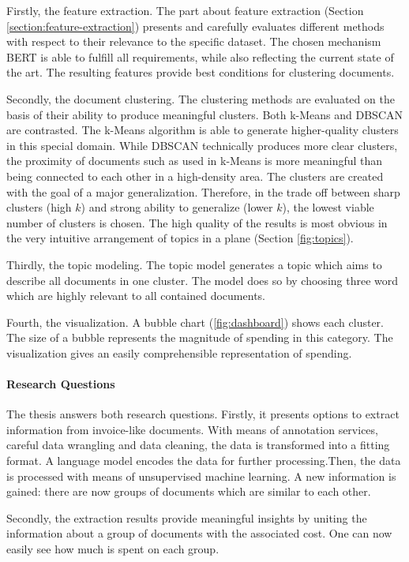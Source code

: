 Firstly, the feature extraction. The part about feature extraction (Section \ref{section:feature-extraction}) presents and carefully evaluates different methods with respect to their relevance to the specific dataset. The chosen mechanism \ac{BERT} is able to fulfill all requirements, while also reflecting the current state of the art. The resulting features provide best conditions for clustering documents.

Secondly, the document clustering.
The clustering methods are evaluated on the basis of their ability to produce meaningful clusters. 
Both k-Means and \ac{DBSCAN} are contrasted. 
The k-Means algorithm is able to generate higher-quality clusters in this special domain. While \ac{DBSCAN} technically produces more clear clusters, the proximity of documents such as used in k-Means is more meaningful than being connected to each other in a high-density area.
The clusters are created with the goal of a major generalization. Therefore, in the trade off between sharp clusters (high $k$) and strong ability to generalize (lower $k$), the lowest viable number of clusters is chosen. The high quality of the results is most obvious in the very intuitive arrangement of topics in a plane (Section \ref{fig:topics}).

Thirdly, the topic modeling.
The topic model generates a topic which aims to describe all documents in one cluster. The model does so by choosing three word which are highly relevant to all contained documents. 

Fourth, the visualization.
A bubble chart (\ref{fig:dashboard}) shows each cluster. The size of a bubble represents the magnitude of spending in this category.
The visualization gives an easily comprehensible representation of spending. 

\paragraph{Research Questions}
The thesis answers both research questions. Firstly, it presents options to extract information from invoice-like documents. With means of annotation services, careful data wrangling and data cleaning, the data is transformed into a fitting format. A language model encodes the data for further processing.Then, the data is processed with means of unsupervised machine learning. A new information is gained: there are now groups of documents which are similar to each other.

Secondly, the extraction results provide meaningful insights by uniting the information about a group of documents with the associated cost. One can now easily see how much is spent on each group.